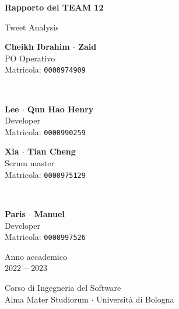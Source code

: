 \documentclass[11pt]{article}
\begin{document}
\begin{titlepage}
    \begin{center}
        \vspace*{1.5cm}
            
        \Huge
        \textbf{Rapporto del TEAM 12}
            
        \vspace{0.3cm}
        \LARGE
        Tweet Analysis\\[0.2em]

        \vspace{1.5cm}
          
        \begin{minipage}[t]{0.47\textwidth}
            \begin{center}
                \parbox{50mm}{\centering\large {\bf Cheikh Ibrahim $\cdot$ Zaid} \\[0.2em] PO Operativo \\[0.3em] Matricola: \texttt{0000974909}}\\[2em]
                \parbox{50mm}{\centering\large {\bf Lee $\cdot$ Qun Hao Henry} \\[0.2em] Developer \\[0.3em] Matricola: \texttt{0000990259}}
            \end{center}
		\end{minipage}
		\hfill
		\begin{minipage}[t]{0.47\textwidth}\raggedleft
            \begin{center}
                \parbox{50mm}{\centering\large {\bf Xia $\cdot$ Tian Cheng} \\[0.2em] Scrum master \\[0.3em] Matricola: \texttt{0000975129}}\\[2em]
                \parbox{50mm}{\centering\large {\bf Paris $\cdot$ Manuel} \\[0.2em] Developer \\[0.3em] Matricola: \texttt{0000997526}}
            \end{center}
		\end{minipage}  
            
        \vspace{6cm}
            
        Anno accademico\\
        $2022 - 2023$
            
        \vspace{0.8cm}
            
            
        \Large
        Corso di Ingegneria del Software\\
        Alma Mater Studiorum $\cdot$ Università di Bologna\\
            
    \end{center}
\end{titlepage}
\pagebreak
\end{document}
